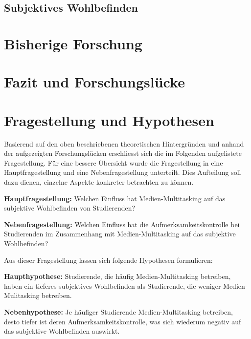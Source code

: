 \subsection{Subjektives Wohlbefinden}\label{subsection.subjektivesWohlbefinden}

\section{Bisherige Forschung}\label{section.bisherigeForschung}

\section{Fazit und Forschungslücke}\label{section.fazitLücke}

\section{Fragestellung und Hypothesen}\label{section.fragestellung}
Basierend auf den oben beschriebenen theoretischen Hintergründen und anhand der aufgezeigten Forschungslücken erschliesst sich die im Folgenden aufgelistete Fragestellung. Für eine bessere Übersicht wurde die Fragestellung in eine Hauptfragestellung und eine Nebenfragestellung unterteilt. Dies Aufteilung soll dazu dienen, einzelne Aspekte konkreter betrachten zu können. \par
\textbf{Hauptfragestellung:} Welchen Einfluss hat Medien-Multitasking auf das subjektive Wohlbefinden von Studierenden?\par
\textbf{Nebenfragestellung:} Welchen Einfluss hat die Aufmerksamkeitskontrolle bei Studierenden im Zusammenhang mit Medien-Multitasking auf das subjektive Wohlbefinden?\par
Aus dieser Fragestellung lassen sich folgende Hypothesen formulieren:\par
\textbf{Haupthypothese:}
Studierende, die häufig Medien-Multitasking betreiben, haben ein tieferes subjektives Wohlbefinden als Studierende, die weniger Medien-Mulitasking betreiben.\par
\textbf{Nebenhypothese:}
Je häufiger Studierende Medien-Multitasking betreiben, desto tiefer ist deren Aufmerksamkeitskontrolle, was sich wiederum negativ auf das subjektive Wohlbefinden auswirkt.\par





